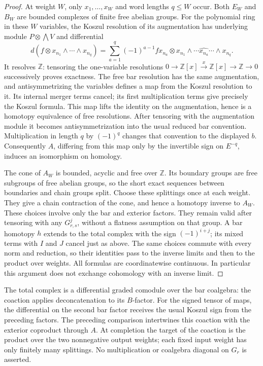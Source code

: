\begin{proof}
At weight \(W\), only \(x_1,\ldots,x_W\) and word lengths
\(q\leq W\) occur. Both \(E_W\) and \(B_W\) are bounded complexes
of finite free abelian groups. For the polynomial ring in these
\(W\) variables, the Koszul resolution of its augmentation has
underlying module \(P\otimes\bigwedge V\) and differential
\[
 d(f\otimes x_{n_1}\wedge\cdots\wedge x_{n_q})
 =\sum_{a=1}^q(-1)^{a-1}fx_{n_a}\otimes
 x_{n_1}\wedge\cdots\widehat{x_{n_a}}\cdots\wedge x_{n_q}.
\]
It resolves \(\mathbb Z\): tensoring the one-variable resolutions
\(0\to\mathbb Z[x]\xrightarrow{x}\mathbb Z[x]\to\mathbb Z\to0\)
successively proves exactness. The free bar resolution has the same
augmentation, and antisymmetrizing the variables defines a map
from the Koszul resolution to it. Its internal merger terms cancel;
its first multiplication terms give precisely the Koszul formula.
This map lifts the identity on the augmentation, hence is a
homotopy equivalence of free resolutions. After tensoring with the
augmentation module it becomes antisymmetrization into the usual
reduced bar convention. Multiplication in length \(q\) by
\((-1)^q\) changes that convention to the displayed \(b\).
Consequently \(A\), differing from this map only by the invertible
sign on \(E^{-q}\), induces an isomorphism on homology.

The cone of \(A_W\) is bounded, acyclic and free over \(\mathbb Z\).
Its boundary groups are free subgroups of free abelian groups, so
the short exact sequences between boundaries and chain groups
split. Choose these splittings once at each weight. They give a
chain contraction of the cone, and hence a homotopy inverse to
\(A_W\). These choices involve only the bar and exterior factors.
They remain valid after tensoring with any \(G_{r,s}^j\), without a
flatness assumption on that group. A bar homotopy \(h\) extends to
the total complex with the sign \((-1)^{i+j}\); its mixed terms
with \(I\) and \(J\) cancel just as above. The same choices commute
with every norm and reduction, so their identities pass to the
inverse limits and then to the product over weights. All formulas
are coordinatewise continuous. In particular this argument does
not exchange cohomology with an inverse limit.
\end{proof}

The total complex is a differential graded comodule over the bar
coalgebra: the coaction applies deconcatenation to its \(B\)-factor.
For the signed tensor of maps, the differential on the second
bar factor receives the usual Koszul sign from the preceding
factors. The preceding comparison intertwines this coaction with
the exterior coproduct through \(A\). At completion the target of
the coaction is the product over the two nonnegative output
weights; each fixed input weight has only finitely many splittings.
No multiplication or coalgebra diagonal on \(G_r\) is asserted.

